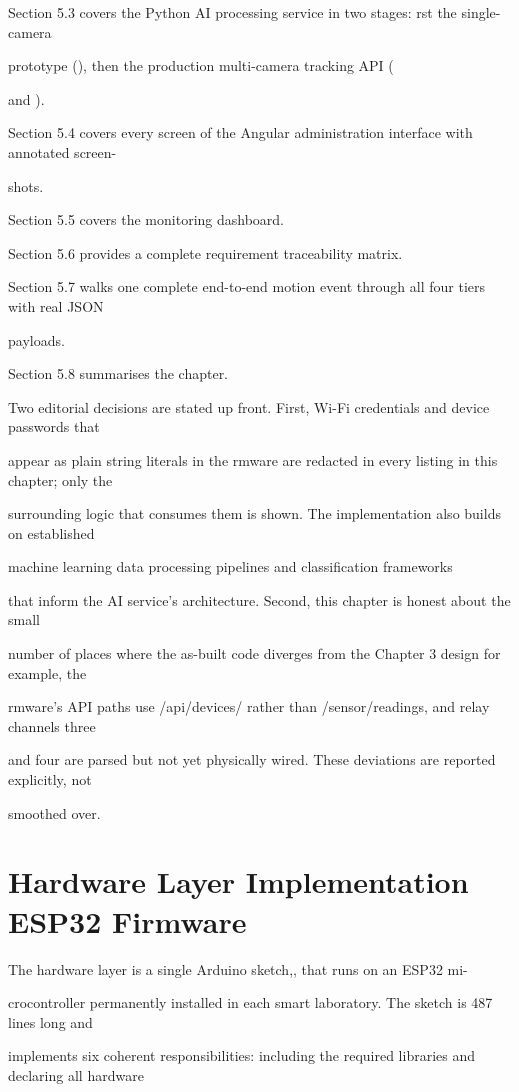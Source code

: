 Section 5.3 covers the Python AI processing service in two stages: rst the single-camera

prototype (), then the production multi-camera tracking API (

and ).

Section 5.4 covers every screen of the Angular administration interface with annotated screen-

shots.

Section 5.5 covers the monitoring dashboard.

Section 5.6 provides a complete requirement traceability matrix.

Section 5.7 walks one complete end-to-end motion event through all four tiers with real JSON

payloads.

Section 5.8 summarises the chapter.

Two editorial decisions are stated up front. First, Wi-Fi credentials and device passwords that

appear as plain string literals in the rmware are redacted in every listing in this chapter; only the

surrounding logic that consumes them is shown. The implementation also builds on established

machine learning data processing pipelines \cite{murray2021} and classiﬁcation frameworks

\cite{cervantes2020} that inform the AI service's architecture. Second, this chapter is honest about the small

number of places where the as-built code diverges from the Chapter 3 design  for example, the

rmware's API paths use /api/devices/ rather than /sensor/readings, and relay channels three

and four are parsed but not yet physically wired. These deviations are reported explicitly, not

smoothed over.


\section{Hardware Layer Implementation  ESP32 Firmware}
The hardware layer is a single Arduino sketch,, that runs on an ESP32 mi-

crocontroller permanently installed in each smart laboratory. The sketch is 487 lines long and

implements six coherent responsibilities: including the required libraries and declaring all hardware

